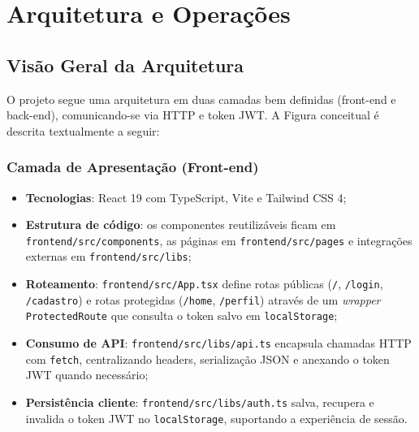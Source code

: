 \chapter{Arquitetura e Operações}

\section{Visão Geral da Arquitetura}
O projeto segue uma arquitetura em duas camadas bem definidas (front-end e back-end), comunicando-se via HTTP e token JWT. A Figura conceitual é descrita textualmente a seguir:

\subsection{Camada de Apresentação (Front-end)}
\begin{itemize}
    \item \textbf{Tecnologias}: React 19 com TypeScript, Vite e Tailwind CSS 4;
    \item \textbf{Estrutura de código}: os componentes reutilizáveis ficam em \texttt{frontend/src/components}, as páginas em \texttt{frontend/src/pages} e integrações externas em \texttt{frontend/src/libs};
    \item \textbf{Roteamento}: \texttt{frontend/src/App.tsx} define rotas públicas (\texttt{/}, \texttt{/login}, \texttt{/cadastro}) e rotas protegidas (\texttt{/home}, \texttt{/perfil}) através de um \textit{wrapper} \texttt{ProtectedRoute} que consulta o token salvo em \texttt{localStorage};
    \item \textbf{Consumo de API}: \texttt{frontend/src/libs/api.ts} encapsula chamadas HTTP com \texttt{fetch}, centralizando headers, serialização JSON e anexando o token JWT quando necessário;
    \item \textbf{Persistência cliente}: \texttt{frontend/src/libs/auth.ts} salva, recupera e invalida o token JWT no \texttt{localStorage}, suportando a experiência de sessão.
\end{itemize}

